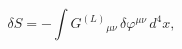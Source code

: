 \begin{equation}
\delta S=-\int G^{(L)}{}_{\mu \nu }\,\delta\varphi^{\mu\nu}\,d^{4}x,
\label{018bis}
\end{equation}


